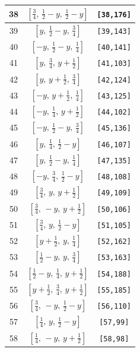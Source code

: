 \documentclass[fleqn,8pt]{jsarticle}
\begin{document}
\begin{longtable}{ccc}
38 & $\left[ \frac{3}{4},\, \frac{1}{2} - y,\, \frac{1}{2} - y \right]$ & {\tt [38,176]} \\ \hline
39 & $\left[ y,\, \frac{1}{2} - y,\, \frac{3}{4} \right]$ & {\tt [39,143]} \\ \hline
40 & $\left[ - y,\, \frac{1}{2} - y,\, \frac{1}{4} \right]$ & {\tt [40,141]} \\ \hline
41 & $\left[ y,\, \frac{3}{4},\, y + \frac{1}{2} \right]$ & {\tt [41,103]} \\ \hline
42 & $\left[ y,\, y + \frac{1}{2},\, \frac{3}{4} \right]$ & {\tt [42,124]} \\ \hline
43 & $\left[ - y,\, y + \frac{1}{2},\, \frac{1}{4} \right]$ & {\tt [43,125]} \\ \hline
44 & $\left[ - y,\, \frac{1}{4},\, y + \frac{1}{2} \right]$ & {\tt [44,102]} \\ \hline
45 & $\left[ - y,\, \frac{1}{2} - y,\, \frac{3}{4} \right]$ & {\tt [45,136]} \\ \hline
46 & $\left[ y,\, \frac{1}{4},\, \frac{1}{2} - y \right]$ & {\tt [46,107]} \\ \hline
47 & $\left[ y,\, \frac{1}{2} - y,\, \frac{1}{4} \right]$ & {\tt [47,135]} \\ \hline
48 & $\left[ - y,\, \frac{3}{4},\, \frac{1}{2} - y \right]$ & {\tt [48,108]} \\ \hline
49 & $\left[ \frac{3}{4},\, y,\, y + \frac{1}{2} \right]$ & {\tt [49,109]} \\ \hline
50 & $\left[ \frac{3}{4},\, - y,\, y + \frac{1}{2} \right]$ & {\tt [50,106]} \\ \hline
51 & $\left[ \frac{3}{4},\, y,\, \frac{1}{2} - y \right]$ & {\tt [51,105]} \\ \hline
52 & $\left[ y + \frac{1}{2},\, y,\, \frac{1}{4} \right]$ & {\tt [52,162]} \\ \hline
53 & $\left[ \frac{1}{2} - y,\, y,\, \frac{3}{4} \right]$ & {\tt [53,163]} \\ \hline
54 & $\left[ \frac{1}{2} - y,\, \frac{1}{4},\, y + \frac{1}{2} \right]$ & {\tt [54,188]} \\ \hline
55 & $\left[ y + \frac{1}{2},\, \frac{3}{4},\, y + \frac{1}{2} \right]$ & {\tt [55,185]} \\ \hline
56 & $\left[ \frac{3}{4},\, - y,\, \frac{1}{2} - y \right]$ & {\tt [56,110]} \\ \hline
57 & $\left[ \frac{1}{4},\, y,\, \frac{1}{2} - y \right]$ & {\tt [57,99]} \\ \hline
58 & $\left[ \frac{1}{4},\, - y,\, y + \frac{1}{2} \right]$ & {\tt [58,98]} \\ \hline

\end{longtable}
\end{document}
